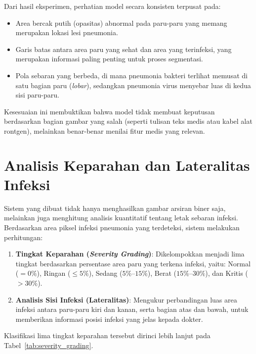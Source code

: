 \documentclass[12pt,a4paper,oneside]{book}
\begin{document}
Dari hasil eksperimen, perhatian model secara konsisten terpusat pada:
\begin{itemize}
  \item Area bercak putih (opasitas) abnormal pada paru-paru yang memang merupakan lokasi lesi pneumonia.
  \item Garis batas antara area paru yang sehat dan area yang terinfeksi, yang merupakan informasi paling penting untuk proses segmentasi.
  \item Pola sebaran yang berbeda, di mana pneumonia bakteri terlihat memusat di satu bagian paru (\textit{lobar}), sedangkan pneumonia virus menyebar luas di kedua sisi paru-paru.
\end{itemize}

Kesesuaian ini membuktikan bahwa model tidak membuat keputusan berdasarkan bagian gambar yang salah (seperti tulisan teks medis atau kabel alat rontgen), melainkan benar-benar menilai fitur medis yang relevan.

\section{Analisis Keparahan dan Lateralitas Infeksi}

Sistem yang dibuat tidak hanya menghasilkan gambar arsiran biner saja, melainkan juga menghitung analisis kuantitatif tentang letak sebaran infeksi. Berdasarkan area piksel infeksi pneumonia yang terdeteksi, sistem melakukan perhitungan:

\begin{enumerate}
  \item \textbf{Tingkat Keparahan (\textit{Severity Grading})}: Dikelompokkan menjadi lima tingkat berdasarkan persentase area paru yang terkena infeksi, yaitu: Normal ($= 0\%$), Ringan ($ \le 5\%$), Sedang ($5\%$--$15\%$), Berat ($15\%$--$30\%$), dan Kritis ($> 30\%$).
  \item \textbf{Analisis Sisi Infeksi (Lateralitas)}: Mengukur perbandingan luas area infeksi antara paru-paru kiri dan kanan, serta bagian atas dan bawah, untuk memberikan informasi posisi infeksi yang jelas kepada dokter.
\end{enumerate}

Klasifikasi lima tingkat keparahan tersebut dirinci lebih lanjut pada Tabel~\ref{tab:severity_grading}.
\end{document}
